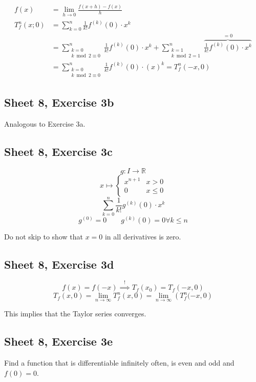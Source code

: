 \documentclass{article}
\begin{document}
\begin{align*}
  f(x) &= \lim_{h\to0} \frac{f(x + h) - f(x)}{h} \\
  T_f^n(x; 0) &= \sum_{k=0}^n \frac{1}{k!} f^{(k)}(0) \cdot x^k \\
  &= \sum_{\substack{k=0 \\ k \bmod{2} \equiv 0}}^n \frac{1}{k!} f^{(k)}(0) \cdot x^k + \sum_{\substack{k=1 \\ k \bmod{2} = 1}}^n \overbrace{\frac{1}{k!}f^{(k)}(0) \cdot x^k}^{=0} \\
  &= \sum_{\substack{k = 0 \\ k \bmod{2} \equiv 0}}^n \frac{1}{k!} f^{(k)}(0) \cdot (x)^k = T_f^n(-x, 0)
\end{align*}

\subsection{Sheet 8, Exercise 3b}
Analogous to Exercise 3a.

\subsection{Sheet 8, Exercise 3c}
\[ g: I \to \mathbb R \]
\[ x \mapsto \begin{cases} x^{n+1} & x > 0 \\ 0 & x \leq 0 \end{cases} \]
\[ \sum_{k=0}^n \frac{1}{k!} g^{(k)}(0) \cdot x^k \]
\[ g^{(0)} = 0 \qquad g^{(k)}(0) = 0 \forall k \leq n \]

Do not skip to show that $x=0$ in all derivatives is zero.

\subsection{Sheet 8, Exercise 3d}

\[ f(x) = f(-x) \overset!\implies T_f(x_0) = T_f(-x, 0) \]
\[ T_f(x, 0) = \lim_{n\to\infty} T_f^n(x, 0) = \lim_{n\to\infty} \left(T_f^n(-x, 0\right) \]

This implies that the Taylor series converges.

\subsection{Sheet 8, Exercise 3e}

Find a function that is differentiable infinitely often, is even and odd and $f(0) = 0$.
\end{document}
